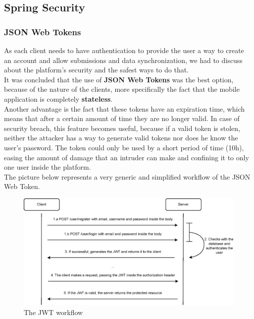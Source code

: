 \subsection{Spring Security}

\subsubsection{JSON Web Tokens}

As each client needs to have authentication to provide the user a way to create an account and allow submissions and data synchronization,
we had to discuss about the platform's security and the safest ways to do that.\\

It was concluded that the use of \textbf{JSON Web Tokens}\cite{jwt} was the best option, because of the nature of the clients, more specifically the fact that
the mobile application is completely \textbf{stateless}.\\

Another advantage is the fact that these tokens have an expiration time, which means that after a certain amount of time they are no longer valid.
In case of security breach, this feature becomes useful, because if a valid token is stolen, neither the attacker has a way to generate valid tokens 
nor does he know the user's password. The token could only be used by a short period of time (10h), easing the amount of damage that an intruder can
make and confining it to only one user inside the platform.\\

The picture below represents a very generic and simplified workflow of the JSON Web Token. 

\begin{figure}[H]
    \begin{center}
        \includegraphics[scale=0.9]{_figures/JWT-simple-diagram.eps}
        \caption{The JWT workflow}
    \end{center}
\end{figure}

